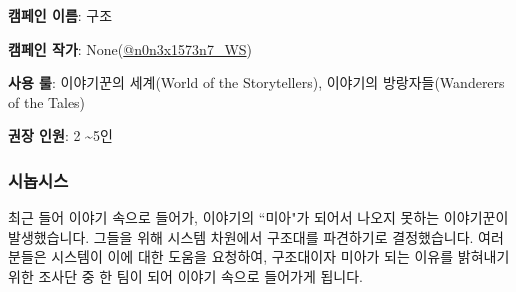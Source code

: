 \documentclass{report}
\begin{document}
	\textbf{캠페인 이름}: 구조
	
	\textbf{캠페인 작가}: None(\href{https://www.twitter.com/n0n3x1573n7_WS}{@n0n3x1573n7\_WS})
	
	\textbf{사용 룰}: 이야기꾼의 세계(World of the Storytellers), 이야기의 방랑자들(Wanderers of the Tales)
	
	\textbf{권장 인원}: 2 \textasciitilde 5인
	
	\subsubsection*{시놉시스}
		최근 들어 이야기 속으로 들어가, 이야기의 ``미아"가 되어서 나오지 못하는 이야기꾼이 발생했습니다.  그들을 위해 시스템 차원에서 구조대를 파견하기로 결정했습니다. 여러분들은 시스템이 이에 대한 도움을 요청하여, 구조대이자 미아가 되는 이유를 밝혀내기 위한 조사단 중 한 팀이 되어 이야기 속으로 들어가게 됩니다.
	
\end{document}
